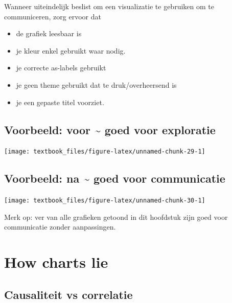 \documentclass[]{tufte-book}
\providecommand{\tightlist}{%
  \setlength{\itemsep}{0pt}\setlength{\parskip}{0pt}}
\begin{document}
Wanneer uiteindelijk beslist om een visualizatie te gebruiken om te communiceren, zorg ervoor dat

\begin{itemize}
\tightlist
\item
  de grafiek leesbaar is
\item
  je kleur enkel gebruikt waar nodig.
\item
  je correcte as-labels gebruikt
\item
  je geen theme gebruikt dat te druk/overheersend is
\item
  je een gepaste titel voorziet.
\end{itemize}

\hypertarget{voorbeeld-voor-goed-voor-exploratie}{%
\subsection{Voorbeeld: voor \textasciitilde{} goed voor exploratie}\label{voorbeeld-voor-goed-voor-exploratie}}

\texttt{[image: textbook\_files/figure-latex/unnamed-chunk-29-1]}

\hypertarget{voorbeeld-na-goed-voor-communicatie}{%
\subsection{Voorbeeld: na \textasciitilde{} goed voor communicatie}\label{voorbeeld-na-goed-voor-communicatie}}

\texttt{[image: textbook\_files/figure-latex/unnamed-chunk-30-1]}

Merk op: ver van alle grafieken getoond in dit hoofdstuk zijn goed voor communicatie zonder aanpassingen.

\hypertarget{how-charts-lie}{%
\section{How charts lie}\label{how-charts-lie}}

\hypertarget{causaliteit-vs-correlatie}{%
\subsection{Causaliteit vs correlatie}\label{causaliteit-vs-correlatie}}
\end{document}

